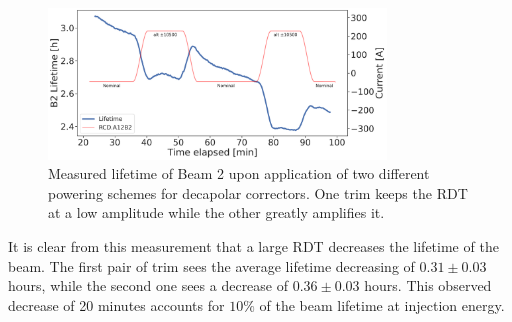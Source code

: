 \begin{figure}[!htb]
    \centering
    \includegraphics[width=0.8\textwidth]{./images/b5_lifetime.pdf}
    \caption{Measured lifetime of Beam 2 upon application of two different powering schemes for
    decapolar correctors. One trim keeps the RDT at a low amplitude while the other greatly
    amplifies it.}
    \label{fig:decapoles:impact:b5_lifetime}
\end{figure}

It is clear from this measurement that a large RDT decreases the lifetime of the beam.
The first pair of trim sees the average lifetime decreasing of $0.31 \pm 0.03$ hours, while the
second one sees a decrease of $0.36 \pm 0.03$ hours. This observed decrease of 20 minutes accounts
for $10\%$ of the beam lifetime at injection energy.

